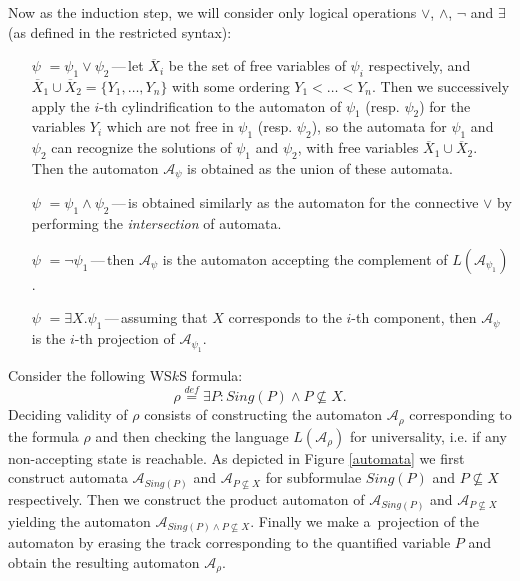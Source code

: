 Now as the induction step, we will consider only logical operations $\vee$,
$\wedge$, $\neg$ and $\exists$ (as defined in the restricted syntax):
\begin{itemize}
 \item[$\psi$]$ = \psi_1 \vee \psi_2$\,---\,let $\overline{X}_i$ be the set of
 free variables of $\psi_i$ respectively, and $\overline{X}_1 \cup
 \overline{X}_2 = \{Y_1,\ldots,Y_n\}$ with some ordering $Y_1 < \ldots < Y_n$.
 Then we successively apply the $i$-th cylindrification to the automaton of
 $\psi_1$ (resp. $\psi_2$) for the variables $Y_i$ which are not free in
 $\psi_1$ (resp. $\psi_2$), so the automata for $\psi_1$ and $\psi_2$ can
 recognize the solutions of $\psi_1$ and $\psi_2$, with free variables
 $\overline{X}_1 \cup \overline{X}_2$. Then the automaton $\mathcal{A}_\psi$ is
 obtained as the union of these automata.
 \item[$\psi$]$ = \psi_1 \wedge \psi_2$\,---\,is obtained similarly as
 the automaton for the connective $\vee$ by performing the \emph{intersection}
 of automata.
 \item[$\psi$]$ = \neg\psi_1$\,---\,then $\mathcal{A}_\psi$ is the automaton
 accepting the complement of $L(\mathcal{A}_{\psi_1})$.
 \item[$\psi$]$ = \exists X.\psi_1$\,---\,assuming that $X$ corresponds to the
 $i$-th component, then $\mathcal{A}_\psi$ is the $i$-th projection of
 $\mathcal{A}_{\psi_1}$.
\end{itemize}
\newpage
  \noindent\hrulefill
  \begin{example}
  Consider the following WS$k$S formula:
  \begin{equation}
  \rho \overset{\mathit{def}}{=} \exists P:
 Sing(P) \wedge P \not\subseteq X.
  \end{equation}
  Deciding validity of $\rho$ consists of constructing the automaton
  $\mathcal{A}_\rho$ corresponding to the formula $\rho$ and then
  checking the language $L(\mathcal{A}_\rho)$ for universality, i.e. if any
  non-accepting state is reachable. As depicted in Figure \ref{automata} we
  first construct automata $\mathcal{A}_{\mathit{Sing}(P)}$ and
  $\mathcal{A}_{P \not\subseteq X}$ for subformulae $\mathit{Sing}(P)$ and $P
  \not\subseteq X$ respectively. Then we construct the product automaton of
  $\mathcal{A}_{\mathit{Sing}(P)}$ and
  $\mathcal{A}_{P \not\subseteq X}$ yielding the automaton $\mathcal{A}_{\mathit{Sing}(P) \wedge
  P \not\subseteq X}$. Finally we make a~projection of the automaton by erasing
  the track corresponding to the quantified variable $P$ and obtain the
  resulting automaton $\mathcal{A}_\rho$.

  \end{example}\label{wsks-formula-automaton}
 
